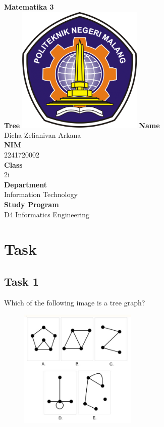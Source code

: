 \documentclass[12pt,titlepage]{article}
\newcommand{\vSubject}{Matematika 3}
\newcommand{\vSubtitle}{Tree}
\newcommand{\vName}{Dicha Zelianivan Arkana}
\newcommand{\vNIM}{2241720002}
\newcommand{\vClass}{2i}
\newcommand{\vDepartment}{Information Technology}
\newcommand{\vStudyProgram}{D4 Informatics Engineering}
\begin{document}
\begin{titlepage}
    \centering
    \vfill
    {\bfseries\LARGE
        \vSubject\\
        \vskip0.25cm
        \vSubtitle
    }
    \vfill
    \includegraphics[width=6cm]{images/polinema-logo.png}
    \vfill
    {
        \textbf{Name}\\
        \vName\\
        \vskip0.5cm
        \textbf{NIM}\\
        \vNIM\\
        \vskip0.5cm
        \textbf{Class}\\
        \vClass\\
        \vskip0.5cm
        \textbf{Department}\\
        \vDepartment\\
        \vskip0.5cm
        \textbf{Study Program}\\
        \vStudyProgram
    }
\end{titlepage}

\section*{Task}
\subsection*{Task 1}
Which of the following image is a tree graph?

\begin{figure}[h]
    \centering
    \includegraphics[width=0.5\textwidth]{images/tree-1.png}
\end{figure}
\end{document}
